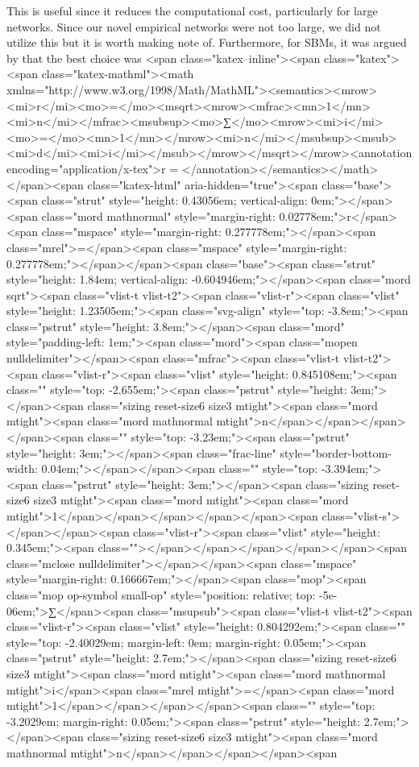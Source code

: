 This is useful since it reduces the computational cost, particularly for large networks. Since our novel empirical networks were not too large, we did not utilize this but it is worth making note of. Furthermore, for SBMs, it was argued by \cite{SaadeBethe} that the best choice was <span class="katex--inline"><span class="katex"><span class="katex-mathml"><math xmlns="http://www.w3.org/1998/Math/MathML"><semantics><mrow><mi>r</mi><mo>=</mo><msqrt><mrow><mfrac><mn>1</mn><mi>n</mi></mfrac><msubsup><mo>∑</mo><mrow><mi>i</mi><mo>=</mo><mn>1</mn></mrow><mi>n</mi></msubsup><msub><mi>d</mi><mi>i</mi></msub></mrow></msqrt></mrow><annotation encoding="application/x-tex">r = </annotation></semantics></math></span><span class="katex-html" aria-hidden="true"><span class="base"><span class="strut" style="height: 0.43056em; vertical-align: 0em;"></span><span class="mord mathnormal" style="margin-right: 0.02778em;">r</span><span class="mspace" style="margin-right: 0.277778em;"></span><span class="mrel">=</span><span class="mspace" style="margin-right: 0.277778em;"></span></span><span class="base"><span class="strut" style="height: 1.84em; vertical-align: -0.604946em;"></span><span class="mord sqrt"><span class="vlist-t vlist-t2"><span class="vlist-r"><span class="vlist" style="height: 1.23505em;"><span class="svg-align" style="top: -3.8em;"><span class="pstrut" style="height: 3.8em;"></span><span class="mord" style="padding-left: 1em;"><span class="mord"><span class="mopen nulldelimiter"></span><span class="mfrac"><span class="vlist-t vlist-t2"><span class="vlist-r"><span class="vlist" style="height: 0.845108em;"><span class="" style="top: -2.655em;"><span class="pstrut" style="height: 3em;"></span><span class="sizing reset-size6 size3 mtight"><span class="mord mtight"><span class="mord mathnormal mtight">n</span></span></span></span><span class="" style="top: -3.23em;"><span class="pstrut" style="height: 3em;"></span><span class="frac-line" style="border-bottom-width: 0.04em;"></span></span><span class="" style="top: -3.394em;"><span class="pstrut" style="height: 3em;"></span><span class="sizing reset-size6 size3 mtight"><span class="mord mtight"><span class="mord mtight">1</span></span></span></span></span><span class="vlist-s">​</span></span><span class="vlist-r"><span class="vlist" style="height: 0.345em;"><span class=""></span></span></span></span></span><span class="mclose nulldelimiter"></span></span><span class="mspace" style="margin-right: 0.166667em;"></span><span class="mop"><span class="mop op-symbol small-op" style="position: relative; top: -5e-06em;">∑</span><span class="msupsub"><span class="vlist-t vlist-t2"><span class="vlist-r"><span class="vlist" style="height: 0.804292em;"><span class="" style="top: -2.40029em; margin-left: 0em; margin-right: 0.05em;"><span class="pstrut" style="height: 2.7em;"></span><span class="sizing reset-size6 size3 mtight"><span class="mord mtight"><span class="mord mathnormal mtight">i</span><span class="mrel mtight">=</span><span class="mord mtight">1</span></span></span></span><span class="" style="top: -3.2029em; margin-right: 0.05em;"><span class="pstrut" style="height: 2.7em;"></span><span class="sizing reset-size6 size3 mtight"><span class="mord mathnormal mtight">n</span></span></span></span><span 